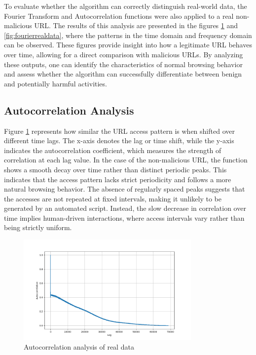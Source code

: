 To evaluate whether the algorithm can correctly distinguish real-world data, the Fourier Transform and Autocorrelation functions were also applied to a real non-malicious URL. The results of this analysis are presented in the figures \ref{fig:autorealdata} and \ref{fig:fourierrealdata}, where the patterns in the time domain and frequency domain can be observed. These figures provide insight into how a legitimate URL behaves over time, allowing for a direct comparison with malicious URLs. By analyzing these outputs, one can identify the characteristics of normal browsing behavior and assess whether the algorithm can successfully differentiate between benign and potentially harmful activities.

\subsection{Autocorrelation Analysis}

Figure \ref{fig:autorealdata} represents how similar the URL access pattern is when shifted over different time lags. The x-axis denotes the lag or time shift, while the y-axis indicates the autocorrelation coefficient, which measures the strength of correlation at each lag value. In the case of the non-malicious URL, the function shows a smooth decay over time rather than distinct periodic peaks. This indicates that the access pattern lacks strict periodicity and follows a more natural browsing behavior. The absence of regularly spaced peaks suggests that the accesses are not repeated at fixed intervals, making it unlikely to be generated by an automated script. Instead, the slow decrease in correlation over time implies human-driven interactions, where access intervals vary rather than being strictly uniform.

\begin{figure}
    \centering
    \includegraphics[width=0.8\textwidth]{../Thesis_Docs/media/auto-realdata.png}
    \caption{Autocorrelation analysis of real data}
    \label{fig:autorealdata}
\end{figure}

